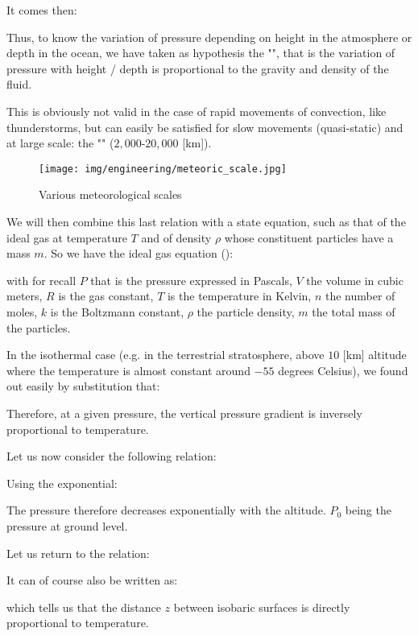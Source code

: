 	It comes then:
	
	Thus, to know the variation of pressure depending on height in the atmosphere or depth in the ocean, we have taken as hypothesis the "", that is the variation of pressure with height / depth is proportional to the gravity and density of the fluid.
	
	This is obviously not valid in the case of rapid movements of convection, like thunderstorms, but can easily be satisfied for slow movements (quasi-static) and at large scale: the "" ($2,000$-$20,000$ [km]).
	\begin{figure}[H]
		\begin{center}
			\texttt{[image: img/engineering/meteoric\_scale.jpg]}
		\end{center}	
		\caption{Various meteorological scales}
	\end{figure}
	We will then combine this last relation with a state equation, such as that of the ideal gas at temperature $T$ and of density $\rho$ whose constituent particles have a mass $m$. So we have the ideal gas equation ():
	
	with for recall $P$ that is the pressure expressed in Pascals, $V$ the volume in cubic meters, $R$ is the gas constant, $T$ is the temperature in Kelvin, $n$ the number of moles, $k$ is the Boltzmann constant, $\rho$ the particle density, $m$ the total mass of the particles.
	
	In the isothermal case (e.g. in the terrestrial stratosphere, above $10$ [km] altitude where the temperature is almost constant around $-55$ degrees Celsius), we found out easily by substitution that:
	
	Therefore, at a given pressure, the vertical pressure gradient is inversely proportional to temperature.

	Let us now consider the following relation:
	
	Using the exponential:
	
	The pressure therefore decreases exponentially with the altitude. $P_0$ being the pressure at ground level.

	Let us return to the relation:
	
	It can of course also be written as:
	
	which tells us that the distance $z$ between isobaric surfaces is directly proportional to temperature.

